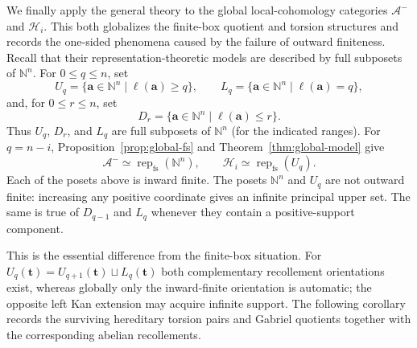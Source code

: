 \documentclass[12pt,reqno]{amsart}
\theoremstyle{definition}
\theoremstyle{remark}
\newcommand{\Rep}{\operatorname{rep}}
\begin{document}
We finally apply the general theory to the global local-cohomology categories
$\mathcal A^-$ and $\mathcal H_i$.  This both globalizes the finite-box
quotient and torsion structures and records the one-sided phenomena caused by
the failure of outward finiteness.  Recall that
their representation-theoretic models are described by full subposets of
$\mathbb N^n$.  For $0\le q\le n$, set
\[
U_q=\{\mathbf a\in\mathbb N^n\mid\ell(\mathbf a)\ge q\},
\qquad
L_q=\{\mathbf a\in\mathbb N^n\mid\ell(\mathbf a)=q\},
\]
and, for $0\le r\le n$, set
\[
D_r=\{\mathbf a\in\mathbb N^n\mid\ell(\mathbf a)\le r\}.
\]
Thus $U_q$, $D_r$, and $L_q$ are full subposets of $\mathbb N^n$ (for the indicated ranges).  For
$q=n-i$, Proposition~\ref{prop:global-fs} and
Theorem~\ref{thm:global-model} give
\[
\mathcal A^-\simeq\Rep_{\mathrm{fs}}(\mathbb N^n),
\qquad
\mathcal H_i\simeq\Rep_{\mathrm{fs}}(U_q).
\]
Each of the posets above is inward finite.  The posets $\mathbb N^n$ and $U_q$
are not outward finite: increasing any positive coordinate gives an infinite
principal upper set.  The same is true of $D_{q-1}$ and $L_q$ whenever they
contain a positive-support component.

This is the essential difference from the finite-box situation.  For
$U_q(\mathbf t)=U_{q+1}(\mathbf t)\sqcup L_q(\mathbf t)$ both complementary
recollement orientations exist, whereas globally only the inward-finite
orientation is automatic; the opposite left Kan extension may acquire
infinite support.  The following corollary records the surviving hereditary
torsion pairs and Gabriel quotients together with the corresponding abelian
recollements.
\end{document}
